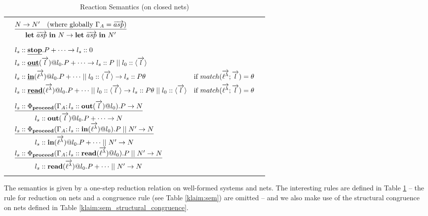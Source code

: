 \documentclass[a4paper]{llncs}
\makeatletter
\newcommand{\netpar}{\mid\mid}
\newcommand{\Let}{{\bf let}}
\newcommand{\Letin}{{\bf in}}
\newcommand{\YZl}{l}
\newcommand{\Lat}{\ell^\lambda}
\newcommand{\veck}[1]{\overrightarrow{#1}}
\newcommand{\Stop}{{\bf stop}}
\newcommand{\Inference}[2]{\begin{array}{@{}c@{}}#1\\[0em]\hline\\[-0.9em]#2\\
\end{array}}
\newenvironment{ARRAY}[1]{%
  \begin{tabular*}{\textwidth}{@{\extracolsep{\fill}}c@{}c@{}c}
  \hline
  &&\\[-5pt]
  &\begin{math}\begin{array}{@{} #1 @{}}
}
{ \end{array}\end{math}&\\
  &&\\[-5pt]
  \hline
  \end{tabular*}
}
\makeatother
\begin{document}
\begin{table}[t]
\begin{ARRAY}{ll}
\Inference{ N \rightarrow N' \ \ \ \hbox{(where globally}\ \Gamma_A = \overrightarrow{asp}) }{\Let\ \overrightarrow{asp}\ \Letin\ N
\rightarrow \Let\ \overrightarrow{asp}\ \Letin\ N'}
\\[4ex]

l_s::\underline{\Stop}.P+\cdots \rightarrow  l_s::0

\\[1ex]
l_s::\underline{\mathbf{out}}(\veck\YZl)@l_0.P+\cdots \rightarrow
l_s::P \netpar l_0::\langle \veck\YZl \rangle

\\[1ex]
l_s::\underline{\mathbf{in}}(\veck\Lat)@l_0.P+ \cdots \netpar
l_0::\langle \veck\YZl \rangle \rightarrow l_s::P
\theta &
\hbox{if $match(\veck\Lat;\veck\YZl)= \theta$}

\\[1ex]
l_s::\underline{\mathbf{read}}(\veck\Lat)@l_0.P+ \cdots \netpar
l_0::\langle \veck\YZl \rangle \rightarrow  l_s::P
\theta \netpar l_0::\langle \veck\YZl \rangle &
\hbox{if $match(\veck\Lat;\veck\YZl)= \theta$}

\\[2ex]
\Inference{
l_s::\Phi_{\mathbf{proceed}}(\Gamma_A;
l_s::\mathbf{out}(\veck\YZl)@l_0).P \rightarrow
N}{ l_s::
\mathbf{out}(\veck\YZl)@l_0.P +\cdots \rightarrow N}

\\[2ex]
\Inference{
l_s::\Phi_{\mathbf{proceed}}(\Gamma_A;
l_s::\mathbf{in}(\veck\Lat)@l_0).P \netpar N'
\rightarrow
N}{ l_s::
\mathbf{in}(\veck\Lat)@l_0.P +\cdots \netpar N'
\rightarrow N}

\\[2ex]
\Inference{
l_s::\Phi_{\mathbf{proceed}}(\Gamma_A;
l_s::\mathbf{read}(\veck\Lat)@l_0).P \netpar N' \rightarrow
N}{ l_s::
\mathbf{read}(\veck\Lat)@l_0.P +\cdots \netpar N' \rightarrow N}

\end{ARRAY}
\caption{Reaction Semantics (on closed nets)}
\label{tab:sem_two}
\end{table}

The semantics is given by a one-step reduction relation on well-formed systems and
nets. The interesting rules are defined in Table
\ref{tab:sem_two} -- the rule for reduction on nets and a 
congruence rule (see Table
\ref{klaim:sem}) are omitted -- and 
we also make use of the structural congruence
on nets defined in Table
\ref{klaim:sem_structural_congruence}. 
\end{document}
